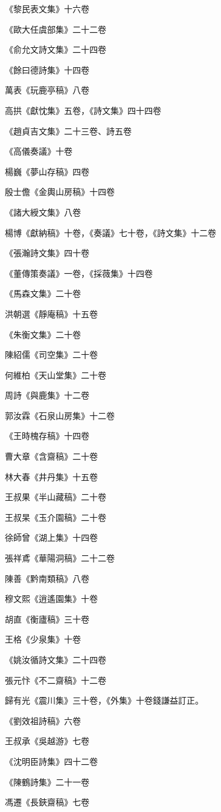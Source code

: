 《黎民表文集》十六卷

《歐大任虞部集》二十二卷

《俞允文詩文集》二十四卷

《餘曰德詩集》十四卷

萬表《玩鹿亭稿》八卷

高拱《獻忱集》五卷，《詩文集》四十四卷

《趙貞吉文集》二十三卷、詩五卷

《高儀奏議》十卷

楊巍《夢山存稿》四卷

殷士儋《金輿山房稿》十四卷

《諸大綬文集》八卷

楊博《獻納稿》十卷，《奏議》七十卷，《詩文集》十二卷

《張瀚詩文集》四十卷

《董傳策奏議》一卷，《採薇集》十四卷

《馬森文集》二十卷

洪朝選《靜庵稿》十五卷

《朱衡文集》二十卷

陳紹儒《司空集》二十卷

何維柏《天山堂集》二十卷

周詩《與鹿集》十二卷

郭汝霖《石泉山房集》十二卷

《王時槐存稿》十四卷

曹大章《含齋稿》二十卷

林大春《井丹集》十五卷

王叔果《半山藏稿》二十卷

王叔杲《玉介園稿》二十卷

徐師曾《湖上集》十四卷

張祥鳶《華陽洞稿》二十二卷

陳善《黔南類稿》八卷

穆文熙《逍遙園集》十卷

胡直《衡廬稿》三十卷

王格《少泉集》十卷

《姚汝循詩文集》二十四卷

張元忭《不二齋稿》十二卷

歸有光《震川集》三十卷，《外集》十卷錢謙益訂正。

《劉效祖詩稿》六卷

王叔承《吳越游》七卷

《沈明臣詩集》四十二卷

《陳鶴詩集》二十一卷

馮遷《長鋏齋稿》七卷

